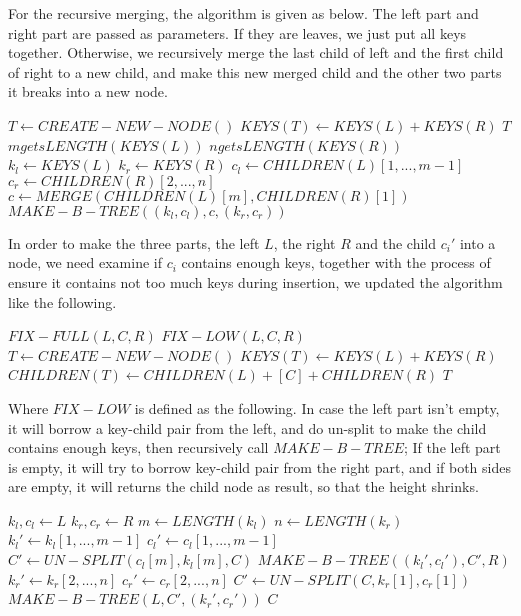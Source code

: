 \documentclass{article}
\begin{document}
For the recursive merging, the algorithm is given as below.
The left part and right part are passed as parameters. If
they are leaves, we just put all keys together. Otherwise,
we recursively merge the last child of left and the first child
of right to a new child, and make this new merged child and
the other two parts it breaks into a new node.

\begin{algorithmic}[1]
    \State $T \gets CREATE-NEW-NODE()$
    \State $KEYS(T) \gets KEYS(L)+KEYS(R)$
    \State \Return $T$
  \Else
    \State $m gets LENGTH(KEYS(L))$
    \State $n gets LENGTH(KEYS(R))$
    \State $k_l \gets KEYS(L)$
    \State $k_r \gets KEYS(R)$
    \State $c_l \gets CHILDREN(L)[1, ..., m-1]$
    \State $c_r \gets CHILDREN(R)[2, ..., n]$
    \State $c \gets MERGE(CHILDREN(L)[m], CHILDREN(R)[1])$
    \State \Return $MAKE-B-TREE((k_l, c_l), c, (k_r, c_r))$
  \EndIf
\EndFunction
\end{algorithmic}

In order to make the three parts, the left $L$, the right $R$ and 
the child $c_i'$ into a node, we need examine if $c_i$ contains 
enough keys, together with the process of ensure it contains not too
much keys during insertion, we updated the algorithm like the following.

\begin{algorithmic}[1]
    \State \Return $FIX-FULL(L, C, R)$
    \State \Return $FIX-LOW(L, C, R)$
  \Else
    \State $T \leftarrow CREATE-NEW-NODE()$
    \State $KEYS(T) \leftarrow KEYS(L) + KEYS(R)$
    \State $CHILDREN(T) \leftarrow CHILDREN(L)+[C]+CHILDREN(R)$
    \State \Return $T$    
  \EndIf
\EndFunction
\end{algorithmic}

Where $FIX-LOW$ is defined as the following. In case the left part
isn't empty, it will borrow a key-child pair from the left, and
do un-split to make the child contains enough keys, then recursively
call $MAKE-B-TREE$; If the left part is empty, it will try to borrow
key-child pair from the right part, and if both sides are empty, it
will returns the child node as result, so that the height shrinks.

\begin{algorithmic}[1]
  \State $k_l, c_l \gets L$
  \State $k_r, c_r \gets R$
  \State $m \gets LENGTH(k_l)$
  \State $n \gets LENGTH(k_r)$
    \State $k_l' \gets k_l[1, ..., m-1]$
    \State $c_l' \gets c_l[1, ..., m-1]$
    \State $C' \gets UN-SPLIT(c_l[m], k_l[m], C)$
    \State \Return $MAKE-B-TREE((k_l', c_l'), C', R)$
    \State $k_r' \gets k_r[2, ..., n]$
    \State $c_r' \gets c_r[2, ..., n]$
    \State $C' \gets UN-SPLIT(C, k_r[1], c_r[1])$
    \State \Return $MAKE-B-TREE(L, C', (k_r', c_r'))$
  \Else
    \State \Return $C$
  \EndIf
\EndFunction
\end{algorithmic}
\end{document}
